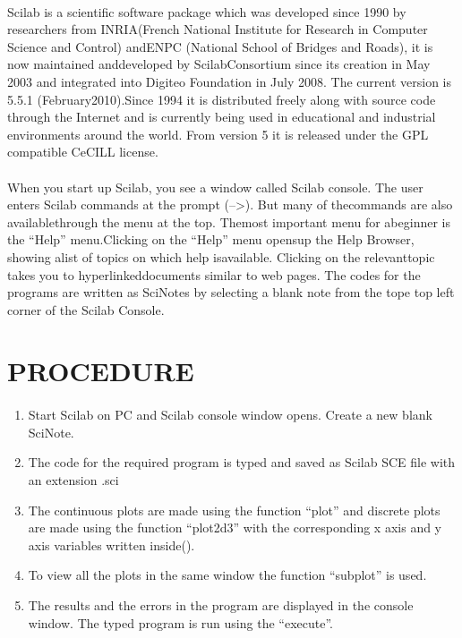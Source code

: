 \paragraph{}

Scilab is a scientific software package which was developed since 1990 by researchers from INRIA(French National Institute for Research in Computer Science and Control) andENPC (National School of Bridges and Roads), it is now maintained anddeveloped by ScilabConsortium since its creation in May 2003 and integrated into Digiteo Foundation in July 2008. The current version is 5.5.1 (February2010).Since 1994 it is distributed freely along with source code through the Internet and is currently being used in educational and industrial environments around the world. From version 5 it is released under the GPL compatible CeCILL license.
\paragraph{}

When you start up Scilab, you see a window called Scilab console. The user enters Scilab commands at the prompt (-->). But many of thecommands are also availablethrough the menu at the top. Themost important menu for abeginner is the “Help” menu.Clicking on the “Help” menu opensup the Help Browser, showing alist of topics on which help isavailable. Clicking on the relevanttopic takes you to hyperlinkeddocuments similar to web pages. The codes for the programs are written as SciNotes by selecting a blank note from the tope top left corner of the Scilab Console.

\section{PROCEDURE}

\paragraph{}
\begin{enumerate}
\item
Start Scilab on PC and Scilab console window opens. Create a new blank SciNote.
\item
The code for the required program is typed and saved as Scilab SCE file with an extension .sci
\item

The continuous plots are made using the function “plot” and discrete plots are made using the function “plot2d3” with the corresponding x axis and y axis variables written inside().

\item
To view all the plots in the same window the function “subplot” is used.
\item
The results and the errors in the program are displayed in the console window.
The typed program is run using the “execute”.
\end{enumerate}

